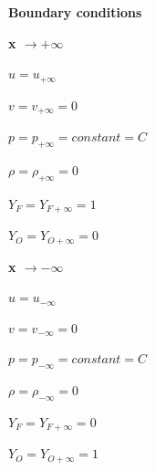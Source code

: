 \clearpage 

\textbf{Boundary conditions}

\textbf{x $\longrightarrow +\infty$}

$u=u_{+\infty}$

$v=v_{+\infty}=0$

$p=p_{+\infty}=constant=C$

$\rho=\rho_{+\infty}=0$

$Y_F=Y_{F+\infty}=1$

$Y_O=Y_{O+\infty}=0$


\textbf{x $\longrightarrow -\infty$}

$u=u_{-\infty}$

$v=v_{-\infty}=0$

$p=p_{-\infty}=constant=C$

$\rho=\rho_{-\infty}=0$

$Y_F=Y_{F+\infty}=0$

$Y_O=Y_{O+\infty}=1$
 


